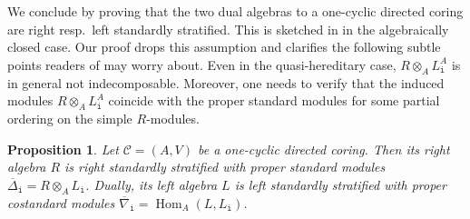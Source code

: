 \documentclass[12pt,a4paper]{amsart}
\theoremstyle{plain}
\newtheorem{prop}[thm]{Proposition}
\theoremstyle{definition}
\numberwithin{equation}{thm}
\DeclareMathOperator{\Hom}{Hom}
\begin{document}
We conclude by proving that the two dual algebras to a one-cyclic directed coring 
are right resp.~left standardly stratified. This is sketched in \cite{Got24} in the algebraically closed case. Our proof drops this assumption and clarifies the following subtle points readers of \cite{Got24} may worry about. Even in the quasi-hereditary case,  $R\otimes_A L_\mathtt{i}^A$ is in general not indecomposable. Moreover, one needs to verify that the induced modules $R\otimes_A L_\mathtt{i}^A$ coincide with the proper standard
modules for some partial ordering on the simple $R$-modules.

\begin{prop}\label{rightstandardlyofonecyclic}
Let $\mathcal{C}=(A,V)$ be a one-cyclic directed coring. Then its right algebra $R$ is right standardly stratified with proper standard modules $\overline{\Delta}_\mathtt{i}=R\otimes_A L_\mathtt{i}$.  Dually, its left algebra $L$ is left standardly stratified with proper costandard modules $\overline{\nabla}_\mathtt{i}=\Hom_A(L,L_\mathtt{i})$. 
\end{prop}
\end{document}
